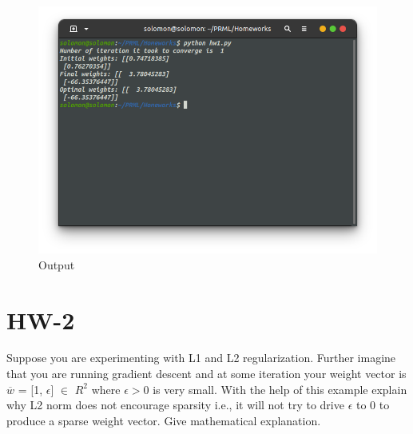 \documentclass{article}
\begin{document}
\begin{figure}[H]
	\includegraphics[scale=0.38]{./figs/op.png}
	\caption{Output}
	\label{fig:op}
\end{figure}
\section*{\hfil HW-2}
Suppose you are experimenting with L1 and L2 regularization. Further imagine that you are running gradient descent and at some iteration your weight vector is $\overline{w}$ = [1, $\epsilon$] $\in$ $R^2$ where $\epsilon > 0$ is very small. With the help of this example explain why L2 norm does not encourage sparsity i.e., it will not try to drive $\epsilon$ to 0 to produce a sparse weight vector. Give mathematical explanation.
\newline
\newline
\end{document}
